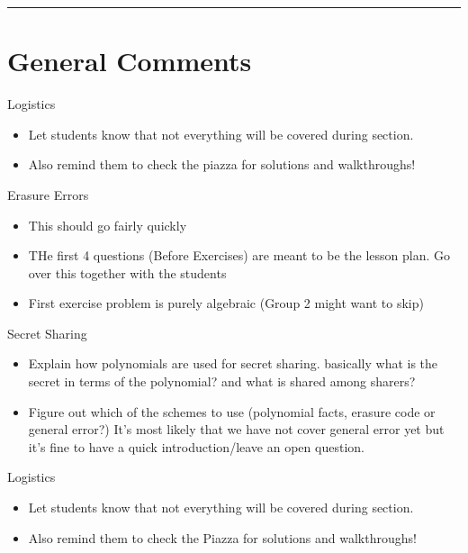 \documentclass{exam}
\title{}
\date{Polynomials, Secret Sharing, Erasure Errors, General Errors, Self Reference}
\begin{document}
\maketitle
\rule{\textwidth}{0.15em}
\fontsize{12}{15}\selectfont
\thispagestyle{empty}

\section{General Comments}
\begin{questions}
	\item Logistics
	\begin{itemize}
		\item Let students know that not everything will be covered during section. 
		\item Also remind them to check the piazza for solutions and walkthroughs!
	\end{itemize}
	\item Erasure Errors
	\begin{itemize}
		\item This should go fairly quickly
		\item THe first 4 questions (Before Exercises) are meant to be the lesson plan. Go over this together with the students
		\item First exercise problem is purely algebraic (Group 2 might want to skip)
	\end{itemize}

\item Secret Sharing
	\begin{itemize}
		\item Explain how polynomials are used for secret sharing. basically what is the secret in terms of the polynomial? and what is shared among sharers?
		\item Figure out which of the schemes to use (polynomial facts, erasure code or general error?) It's most likely that we have not cover general error yet but it's fine to have a quick introduction/leave an open question.
	\end{itemize}


\item Logistics
	\begin{itemize}
		\item Let students know that not everything will be covered during section. 
		\item Also remind them to check the Piazza for solutions and walkthroughs!
	\end{itemize}


\end{questions}
\end{document}
